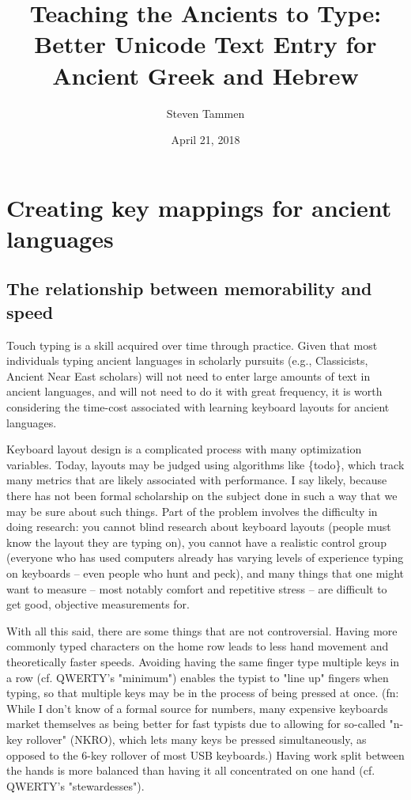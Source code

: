 \documentclass[11pt]{article}
\author{Steven Tammen}
\date{April 21, 2018}
\title{Teaching the Ancients to Type: Better Unicode Text Entry for Ancient Greek and Hebrew}
\begin{document}
\maketitle
\setcounter{tocdepth}{2}
\tableofcontents



\section{Creating key mappings for ancient languages}
\label{sec:orga9abca8}

\subsection{The relationship between memorability and speed}
\label{sec:org78bb4e6}

Touch typing is a skill acquired over time through practice. Given that most individuals typing ancient languages in scholarly pursuits (e.g., Classicists, Ancient Near East scholars) will not need to enter large amounts of text in ancient languages, and will not need to do it with great frequency, it is worth considering the time-cost associated with learning keyboard layouts for ancient languages.

Keyboard layout design is a complicated process with many optimization variables. Today, layouts may be judged using algorithms like \{todo\}, which track many metrics that are likely associated with performance. I say likely, because there has not been formal scholarship on the subject done in such a way that we may be sure about such things. Part of the problem involves the difficulty in doing research: you cannot blind research about keyboard layouts (people must know the layout they are typing on), you cannot have a realistic control group (everyone who has used computers already has varying levels of experience typing on keyboards -- even people who hunt and peck), and many things that one might want to measure -- most notably comfort and repetitive stress -- are difficult to get good, objective measurements for.

With all this said, there are some things that are not controversial. Having more commonly typed characters on the home row leads to less hand movement and theoretically faster speeds. Avoiding having the same finger type multiple keys in a row (cf. QWERTY's "minimum") enables the typist to "line up" fingers when typing, so that multiple keys may be in the process of being pressed at once. (fn: While I don't know of a formal source for numbers, many expensive keyboards market themselves as being better for fast typists due to allowing for so-called "n-key rollover" (NKRO), which lets many keys be pressed simultaneously, as opposed to the 6-key rollover of most USB keyboards.) Having work split between the hands is more balanced than having it all concentrated on one hand (cf. QWERTY's "stewardesses").
\end{document}
